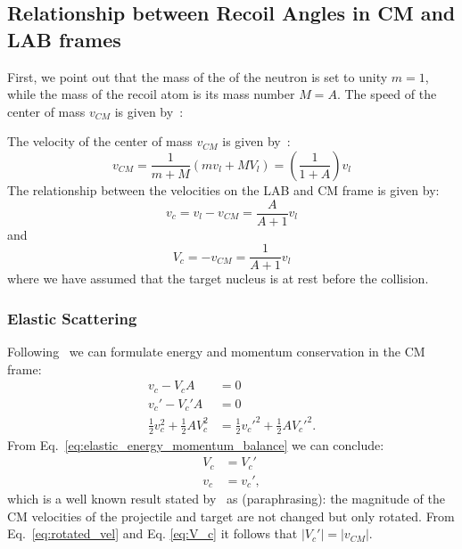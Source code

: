 \documentclass[review]{elsarticle}
\begin{document}
\subsection{Relationship between Recoil Angles in CM and LAB frames}\label{sec:dependence_mu_l_mu_c}
First, we point out that the mass of the of the neutron is set to unity $m=1$, while the mass of the recoil atom is its mass number $M=A$. The speed of the center of mass $v_{CM}$ is given by~\cite{Duderstadt1976}:

The velocity of the center of mass $v_{CM}$ is given by~\cite{Duderstadt1976}:
\begin{equation}
	v_{CM} = \frac{1}{m+M}(m v_l + M V_l) = \left( \frac{1}{1+A}\right) v_l
\end{equation}
The relationship between the velocities on the LAB and CM frame is given by:
\begin{equation}
	v_c = v_l - v_{CM} = \frac{A}{A+1}v_l 
\end{equation}
and
\begin{equation}\label{eq:V_c}
	V_c = - v_{CM} = \frac{1}{A+1}v_l
\end{equation}
where we have assumed that the target nucleus is at rest before the collision. 

\subsubsection{Elastic Scattering}
Following~\cite{GaryWas} we can formulate energy and momentum conservation in the CM frame:
\begin{align} \label{eq:elastic_energy_momentum_balance}
  v_c - V_c A  &= 0 \nonumber \\
  v_c' - V_c' A &= 0 \nonumber \\
  \frac{1}{2} v_c^2 + \frac{1}{2} A V_c^2 &= \frac{1}{2} v_c'^2 + \frac{1}{2} A V_c'^2.
\end{align}
From Eq.~\ref{eq:elastic_energy_momentum_balance} we can conclude:
\begin{align}\label{eq:rotated_vel}
  V_c &= V_c' \nonumber \\
  v_c &= v_c',
\end{align}
which is a well known result stated by~\cite{Duderstadt1976} as (paraphrasing): the magnitude of the CM velocities of the projectile and target are not changed but only rotated.
From Eq.~\ref{eq:rotated_vel} and Eq. \ref{eq:V_c} it follows that $|V_c' | = |v_{CM}|$. 
\end{document}
